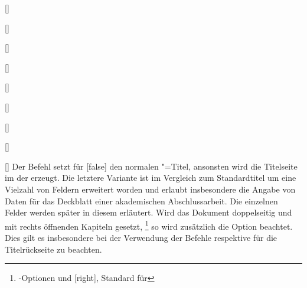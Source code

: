 \begin{Declaration*}{}
\begin{Declaration*}{}
\begin{Declaration*}{}
\begin{Declaration}{}
\begin{Declaration}[v2.02]{%
  []%
}
\begin{Declaration}[v2.02]{[\PSet]}{%
}
\begin{Declaration}[v2.03]{[\PSet]}{%
}
\begin{Declaration}[v2.03]{[\PSet]}{%
}
\begin{Declaration}[v2.03]{%
  []%
}{}
\begin{Declaration}[v2.03]{%
  []
}{}
\begin{Declaration}[v2.03]{[\PSet]}{%
}
\begin{Declaration}[v2.03]{[\PSet]}{%
}
\begin{Declaration}[v2.03]{[\PSet]}{%
}
\printdeclarationlist%
%
%
%
Der Befehl  setzt für [false] den normalen 
\KOMAScript"=Titel{}, ansonsten wird die Titelseite im \CD der \TnUD erzeugt. 
Die letztere Variante ist im Vergleich zum Standardtitel um eine Vielzahl von 
Feldern erweitert worden und erlaubt insbesondere die Angabe von Daten für das 
Deckblatt einer akademischen Abschlussarbeit. Die einzelnen Felder werden 
später in diesem \autorefname erläutert. Wird das Dokument doppelseitig und mit 
rechts öffnenden Kapiteln gesetzt,%
\footnote{%
  \KOMAScript-Optionen  und [right], Standard für 
}
so wird zusätzlich die Option  beachtet. Dies gilt es 
insbesondere bei der Verwendung der Befehle  respektive 
 für die Titelrückseite zu beachten.


\end{Declaration}
\end{Declaration}
\end{Declaration}
\end{Declaration}
\end{Declaration}
\end{Declaration}
\end{Declaration}
\end{Declaration}
\end{Declaration}
\end{Declaration}
\end{Declaration*}
\end{Declaration*}
\end{Declaration*}

